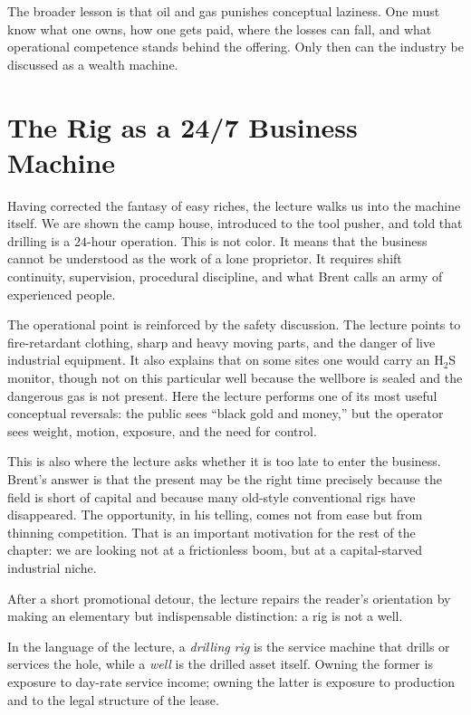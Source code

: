 The broader lesson is that oil and gas punishes conceptual laziness. One must know what one owns, how one gets paid, where the losses can fall, and what operational competence stands behind the offering. Only then can the industry be discussed as a wealth machine.

\section{The Rig as a 24/7 Business Machine}

Having corrected the fantasy of easy riches, the lecture walks us into the machine itself. We are shown the camp house, introduced to the tool pusher, and told that drilling is a \(24\)-hour operation. This is not color. It means that the business cannot be understood as the work of a lone proprietor. It requires shift continuity, supervision, procedural discipline, and what Brent calls an army of experienced people.

The operational point is reinforced by the safety discussion. The lecture points to fire-retardant clothing, sharp and heavy moving parts, and the danger of live industrial equipment. It also explains that on some sites one would carry an H$_2$S monitor, though not on this particular well because the wellbore is sealed and the dangerous gas is not present. Here the lecture performs one of its most useful conceptual reversals: the public sees ``black gold and money,'' but the operator sees weight, motion, exposure, and the need for control.

This is also where the lecture asks whether it is too late to enter the business. Brent's answer is that the present may be the right time precisely because the field is short of capital and because many old-style conventional rigs have disappeared. The opportunity, in his telling, comes not from ease but from thinning competition. That is an important motivation for the rest of the chapter: we are looking not at a frictionless boom, but at a capital-starved industrial niche.

After a short promotional detour, the lecture repairs the reader's orientation by making an elementary but indispensable distinction: a rig is not a well.

\begin{definition}
In the language of the lecture, a \emph{drilling rig} is the service machine that drills or services the hole, while a \emph{well} is the drilled asset itself. Owning the former is exposure to day-rate service income; owning the latter is exposure to production and to the legal structure of the lease.
\end{definition}

